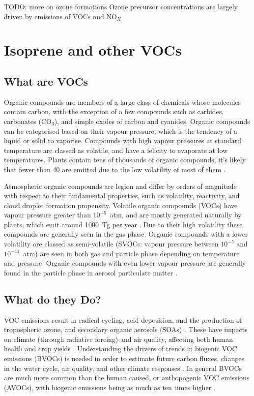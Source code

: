     TODO: more on ozone formations
    Ozone precursor concentrations are largely driven by emissions of VOCs and NO$_X$
    
    

\section{Isoprene and other VOCs}
  \subsection{What are VOCs}
    Organic compounds are members of a large class of chemicals whose molecules contain carbon, with the exception of a few compounds such as carbides, carbonates (CO$_3$), and simple oxides of carbon and cyanides.
    Organic compounds can be categorised based on their vapour pressure, which is the tendency of a liquid or solid to vaporise.
    Compounds with high vapour pressures at standard temperature are classed as volatile, and have a felicity to evaporate at low temperatures.
    Plants contain tens of thousands of organic compounds, it's likely that fewer than 40 are emitted due to the low volatility of most of them \citep{Guenther2000}.
    
    Atmospheric organic compounds are legion and differ by orders of magnitude with respect to their fundamental properties, such as volatility, reactivity, and cloud droplet formation propensity.
    Volatile organic compounds (VOCs) have vapour pressure greater than $10^{-5}$~atm, and are mostly generated naturally by plants, which emit around 1000~Tg per year \citep{Guenther1995, Glasius2016}.
    Due to their high volatility these compounds are generally seen in the gas phase.
    Organic compounds with a lower volatility are classed as semi-volatile (SVOCs: vapour pressure between $10^{-5}$ and $10^{-11}$~atm) are seen in both gas and particle phase depending on temperature and pressure.
    Organic compounds with even lower vapour pressure are generally found in the particle phase in aerosol particulate matter \citep{Glasius2016}.
    
  \subsection{What do they Do?}
    VOC emissions result in radical cycling, acid deposition, and the production of tropospheric ozone, and secondary organic aerosols (SOAs) \citep{Atkinson2000, Kanakidou2005}.
    These have impacts on climate (through radiative forcing) and air quality, affecting both human health and crop yields \citep{IPCC_Chapter2, Avnery2011, Lelieveld2015}.
    Understanding the drivers of trends in biogenic VOC emissions (BVOCs) is needed in order to estimate future carbon fluxes, changes in the water cycle, air quality, and other climate responses \citep{Yue2015}.
    In general BVOCs are much more common than the human caused, or anthopogenic VOC emissions (AVOCs), with biogenic emissions being as much as ten times higher \citep{Kanakidou2005}.
    
